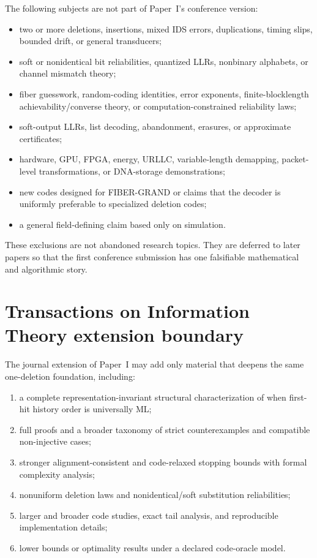 \documentclass[11pt]{article}
\theoremstyle{definition}
\theoremstyle{remark}
\begin{document}
The following subjects are not part of Paper~I's conference version:
\begin{itemize}
  \item two or more deletions, insertions, mixed IDS errors, duplications, timing slips, bounded drift, or general transducers;
  \item soft or nonidentical bit reliabilities, quantized LLRs, nonbinary alphabets, or channel mismatch theory;
  \item fiber guesswork, random-coding identities, error exponents, finite-blocklength achievability/converse theory, or computation-constrained reliability laws;
  \item soft-output LLRs, list decoding, abandonment, erasures, or approximate certificates;
  \item hardware, GPU, FPGA, energy, URLLC, variable-length demapping, packet-level transformations, or DNA-storage demonstrations;
  \item new codes designed for FIBER-GRAND or claims that the decoder is uniformly preferable to specialized deletion codes;
  \item a general field-defining claim based only on simulation.
\end{itemize}

These exclusions are not abandoned research topics. They are deferred to later papers so that the first conference submission has one falsifiable mathematical and algorithmic story.

\section{Transactions on Information Theory extension boundary}

The journal extension of Paper~I may add only material that deepens the same one-deletion foundation, including:
\begin{enumerate}
  \item a complete representation-invariant structural characterization of when first-hit history order is universally ML;
  \item full proofs and a broader taxonomy of strict counterexamples and compatible non-injective cases;
  \item stronger alignment-consistent and code-relaxed stopping bounds with formal complexity analysis;
  \item nonuniform deletion laws and nonidentical/soft substitution reliabilities;
  \item larger and broader code studies, exact tail analysis, and reproducible implementation details;
  \item lower bounds or optimality results under a declared code-oracle model.
\end{enumerate}
\end{document}
